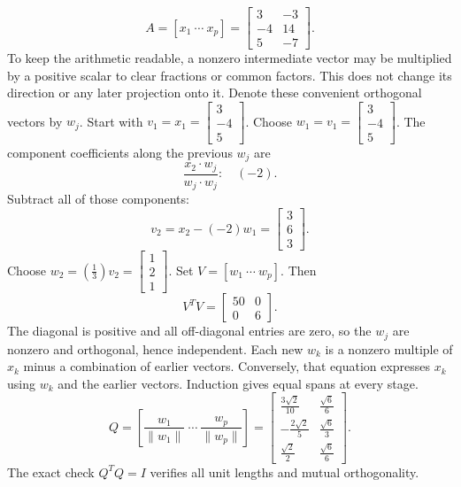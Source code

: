 \[A=[x_1\ \cdots\ x_p]=\left[\begin{array}{rr}3&-3\\-4&14\\5&-7\end{array}\right].\]
To keep the arithmetic readable, a nonzero intermediate vector may be multiplied by a positive scalar to clear fractions or common factors. This does not change its direction or any later projection onto it. Denote these convenient orthogonal vectors by $w_j$.
Start with $v_1=x_1=\left[\begin{array}{r}3\\-4\\5\end{array}\right]$.
Choose $w_{1}=v_{1}=\left[\begin{array}{r}3\\-4\\5\end{array}\right]$.
The component coefficients along the previous $w_j$ are
\[\frac{x_{2}\cdot w_j}{w_j\cdot w_j}:\quad(-2).\]
Subtract all of those components:
\[v_{2}=x_{2}-(-2)w_{1}=\left[\begin{array}{r}3\\6\\3\end{array}\right].\]
Choose $w_{2}=(\frac{1}{3})v_{2}=\left[\begin{array}{r}1\\2\\1\end{array}\right]$.
Set $V=[w_1\ \cdots\ w_p]$. Then
\[V^TV=\left[\begin{array}{rr}50&0\\0&6\end{array}\right].\]
The diagonal is positive and all off-diagonal entries are zero, so the $w_j$ are nonzero and orthogonal, hence independent. Each new $w_k$ is a nonzero multiple of $x_k$ minus a combination of earlier vectors. Conversely, that equation expresses $x_k$ using $w_k$ and the earlier vectors. Induction gives equal spans at every stage.
\[Q=\left[\frac{w_1}{\|w_1\|}\ \cdots\ \frac{w_p}{\|w_p\|}\right]=\left[\begin{array}{rr}\frac{3 \sqrt{2}}{10}&\frac{\sqrt{6}}{6}\\- \frac{2 \sqrt{2}}{5}&\frac{\sqrt{6}}{3}\\\frac{\sqrt{2}}{2}&\frac{\sqrt{6}}{6}\end{array}\right].\]
The exact check $Q^TQ=I$ verifies all unit lengths and mutual orthogonality.

